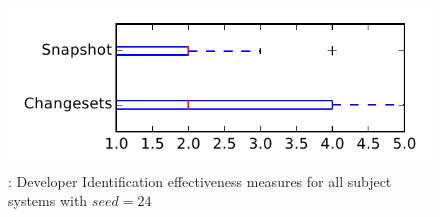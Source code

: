 
\begin{figure}
\centering
\includegraphics[height=0.4\textheight]{figures/dit_seed/rq1_tiny_24}
\caption{\rtwo: Developer Identification effectiveness measures for all subject systems with $seed=24$}
\label{fig:dit_seed:rq1:tiny}
\end{figure}
